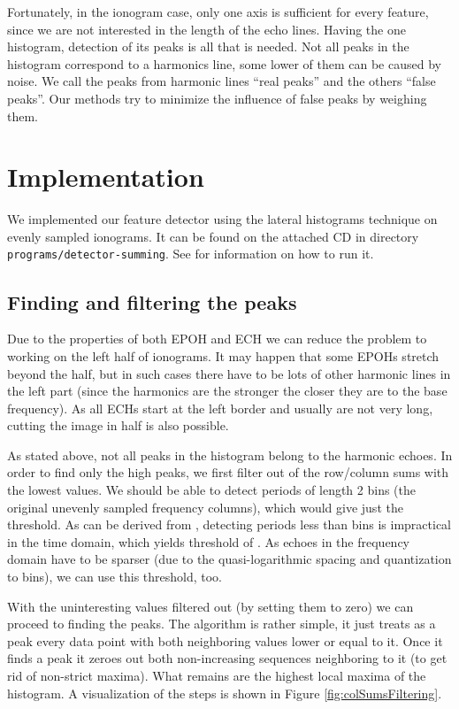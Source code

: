 Fortunately, in the ionogram case, only one axis is sufficient for every feature, since we are not interested in the length of the echo lines. Having the one histogram, detection of its peaks is all that is needed. Not all peaks in the histogram correspond to a harmonics line, some lower of them can be caused by noise. We call the peaks from harmonic lines ``real peaks'' and the others ``false peaks''. Our methods try to minimize the influence of false peaks by weighing them.

\section{Implementation}
We implemented our feature detector using the lateral histograms technique on evenly sampled ionograms. It can be found on the attached CD in directory \texttt{programs/detector-summing}. See  for information on how to run it. 

\subsection{Finding and filtering the peaks}
Due to the properties of both EPOH and ECH we can reduce the problem to working on the left half of ionograms. It may happen that some EPOHs stretch beyond the half, but in such cases there have to be lots of other harmonic lines in the left part (since the harmonics are the stronger the closer they are to the base frequency). As all ECHs start at the left border and usually are not very long, cutting the image in half is also possible.

As stated above, not all peaks in the histogram belong to the harmonic echoes. In order to find only the high peaks, we first filter out  of the row/column sums with the lowest values. We should be able to detect periods of length 2 bins (the original unevenly sampled frequency columns), which would give just the  threshold. As can be derived from \citep[p.~3]{Akalin2010}, detecting periods less than  bins is impractical in the time domain, which yields threshold of . As echoes in the frequency domain have to be sparser (due to the quasi-logarithmic spacing and quantization to bins), we can use this threshold, too.

With the uninteresting values filtered out (by setting them to zero) we can proceed to finding the peaks. The algorithm is rather simple, it just treats as a peak every data point with both neighboring values lower or equal to it. Once it finds a peak it zeroes out both non-increasing sequences neighboring to it (to get rid of non-strict maxima). What remains are the highest local maxima of the histogram. A visualization of the steps is shown in Figure \ref{fig:colSumsFiltering}.

